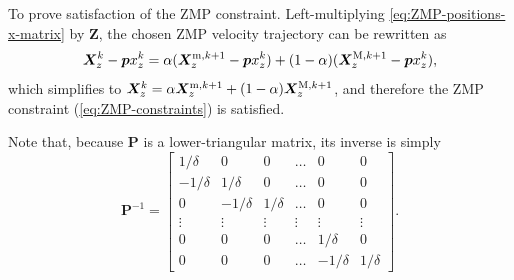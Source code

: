 To prove satisfaction of the ZMP constraint. Left-multiplying
\eqref{eq:ZMP-positions-x-matrix} by $\bm{Z}$, the chosen ZMP velocity
trajectory can be rewritten as
\begin{equation*}
\bm{X}_z^k - \bm{p} x_z^k = \alpha (\bm{X}_z^{{\rm m}, k+1} - \bm{p} x_z^k) + (1-\alpha)(\bm{X}_z^{{\rm M}, k+1} - \bm{p} x_z^k),
\end{equation*}
which simplifies to
$\bm{X}_z^k = \alpha \bm{X}_z^{{\rm m}, k+1} + (1-\alpha)\bm{X}_z^{{\rm M}, k+1}$,
and therefore the ZMP constraint (\ref{eq:ZMP-constraints}) is satisfied.
\hfill\bull

Note that, because $\bm{P}$ is a lower-triangular matrix, its inverse is simply
\begin{equation*}
    \bm{P}^{-1}
    =
    \begin{bmatrix}
         1/\delta &         0 &        0 &  \dots &         0 &        0 \\
        -1/\delta &  1/\delta &        0 &  \dots &         0 &        0 \\
                0 & -1/\delta & 1/\delta &  \dots &         0 &        0 \\
           \vdots &    \vdots &   \vdots & \vdots &    \vdots &   \vdots \\
                0 &         0 &        0 &  \dots &  1/\delta &        0 \\
                0 &         0 &        0 &  \dots & -1/\delta & 1/\delta
    \end{bmatrix}.
\end{equation*}
